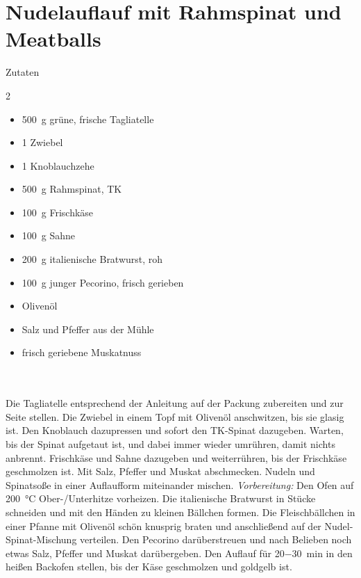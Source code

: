 \section*{Nudelauflauf mit Rahmspinat und Meatballs}
\ihead{}\ohead{}
\cfoot{}
{\Large Zutaten}
\begin{multicols}{2}
\begin{itemize}
\item \SI{500}{g} grüne, frische Tagliatelle
\item \num{1} Zwiebel
\item \num{1} Knoblauchzehe
\item \SI{500}{g} Rahmspinat, TK
\item \SI{100}{g} Frischkäse
\item \SI{100}{g} Sahne
\item \SI{200}{g} italienische Bratwurst, roh
\item \SI{100}{g} junger Pecorino, frisch gerieben
\item Olivenöl
\item Salz und Pfeffer aus der Mühle
\item frisch geriebene Muskatnuss
\end{itemize}
\end{multicols}
\\
\\
Die Tagliatelle entsprechend der Anleitung auf der Packung zubereiten und zur Seite stellen.
Die Zwiebel in einem Topf mit Olivenöl anschwitzen, bis sie glasig ist.
Den Knoblauch dazupressen und sofort den TK-Spinat dazugeben.
Warten, bis der Spinat aufgetaut ist, und dabei immer wieder umrühren, damit nichts anbrennt.
Frischkäse und Sahne dazugeben und weiterrühren, bis der Frischkäse geschmolzen ist.
Mit Salz, Pfeffer und Muskat abschmecken.
Nudeln und Spinatsoße in einer Auflaufform miteinander mischen.
\textit{Vorbereitung:} Den Ofen auf \SI{200}{\celsius} Ober-/Unterhitze vorheizen.
Die italienische Bratwurst in Stücke schneiden und mit den Händen zu kleinen Bällchen formen.
Die Fleischbällchen in einer Pfanne mit Olivenöl schön knusprig braten und anschließend auf der Nudel-Spinat-Mischung verteilen.
Den Pecorino darüberstreuen und nach Belieben noch etwas Salz, Pfeffer und Muskat darübergeben.
Den Auflauf für \SI{20-30}{min} in den heißen Backofen stellen, bis der Käse geschmolzen und goldgelb ist.
